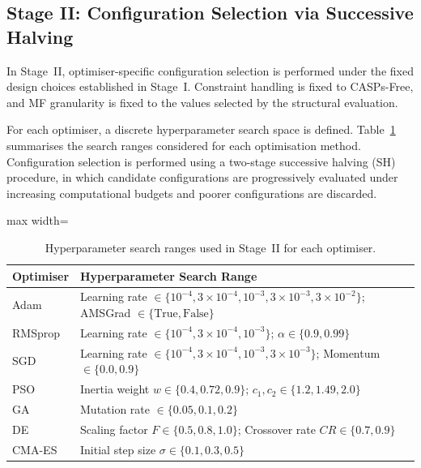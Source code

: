 \documentclass[conference]{IEEEtran}
\begin{document}
\subsection{Stage II: Configuration Selection via Successive Halving}

In Stage~II, optimiser-specific configuration selection is performed under the
fixed design choices established in Stage~I.
Constraint handling is fixed to CASPs-Free, and MF granularity is fixed to the
values selected by the structural evaluation.

For each optimiser, a discrete hyperparameter search space is defined.
Table~\ref{tab:sh_ranges} summarises the search ranges considered for each
optimisation method.
Configuration selection is performed using a two-stage successive halving (SH)
procedure, in which candidate configurations are progressively evaluated under
increasing computational budgets and poorer configurations are discarded.

\begin{table}[t]
\centering
\caption{Hyperparameter search ranges used in Stage~II for each optimiser.}
\label{tab:sh_ranges}
\begin{adjustbox}{max width=\linewidth}
\begin{tabular}{ll}
\toprule
\textbf{Optimiser} & \textbf{Hyperparameter Search Range} \\
\midrule
Adam &
Learning rate $\in \{10^{-4}, 3\times10^{-4}, 10^{-3}, 3\times10^{-3}, 3\times10^{-2}\}$;
AMSGrad $\in \{\text{True}, \text{False}\}$ \\

RMSprop &
Learning rate $\in \{10^{-4}, 3\times10^{-4}, 10^{-3}\}$;
$\alpha \in \{0.9, 0.99\}$ \\

SGD &
Learning rate $\in \{10^{-4}, 3\times10^{-4}, 10^{-3}, 3\times10^{-3}\}$;
Momentum $\in \{0.0, 0.9\}$ \\

PSO &
Inertia weight $w \in \{0.4, 0.72, 0.9\}$;
$c_1, c_2 \in \{1.2, 1.49, 2.0\}$ \\

GA &
Mutation rate $\in \{0.05, 0.1, 0.2\}$ \\

DE &
Scaling factor $F \in \{0.5, 0.8, 1.0\}$;
Crossover rate $CR \in \{0.7, 0.9\}$ \\

CMA-ES &
Initial step size $\sigma \in \{0.1, 0.3, 0.5\}$ \\
\bottomrule
\end{tabular}
\end{adjustbox}
\end{table}
\end{document}
